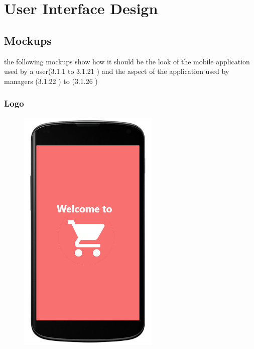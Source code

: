 \section{User Interface Design}
\subsection{Mockups}
the following mockups show how it should be the look of the mobile application used by a user(3.1.1 to 3.1.21 ) and the aspect of the application used by managers (3.1.22 ) to (3.1.26 )
\subsubsection{Logo}
\begin{figure}[H]
  \centering
  \includegraphics[width=0.6\textwidth,keepaspectratio]{images/2.png}
\end{figure}

